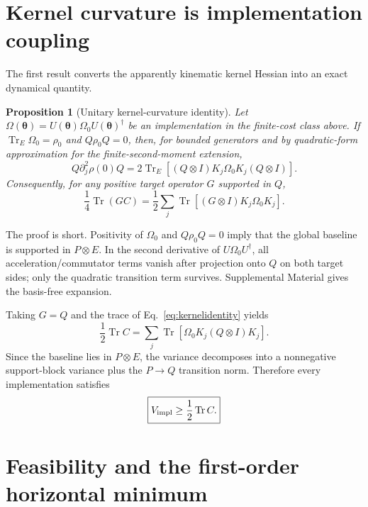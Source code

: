 \documentclass[aps,pra,preprint,nofootinbib]{revtex4-2}
\newtheorem{proposition}{Proposition}
\newcommand{\Tr}{\operatorname{Tr}}
\newcommand{\rhozero}{\rho_0}
\newcommand{\Omegazero}{\Omega_0}
\newcommand{\Vimpl}{V_{\rm impl}}
\newcommand{\Cker}{C}
\begin{document}
\section{Kernel curvature is implementation coupling}

The first result converts the apparently kinematic kernel Hessian into an exact dynamical quantity.

\begin{proposition}[Unitary kernel-curvature identity]
Let $\Omega(\bm\theta)=U(\bm\theta)\Omegazero U(\bm\theta)^\dagger$ be an implementation in the finite-cost class above. If $\Tr_E\Omegazero=\rhozero$ and $Q\rhozero Q=0$, then, for bounded generators and by quadratic-form approximation for the finite-second-moment extension,
\begin{equation}
 Q\partial_j^2\rho(0)Q
 =2\Tr_E\!\left[(Q\otimes I)K_j\Omegazero K_j(Q\otimes I)\right].
 \label{eq:kernelidentity}
\end{equation}
Consequently, for any positive target operator $G$ supported in $Q$,
\begin{equation}
 \frac14\Tr(G\Cker)
 =\frac12\sum_j\Tr\!\left[(G\otimes I)K_j\Omegazero K_j\right].
 \label{eq:weightedidentity}
\end{equation}
\end{proposition}

\noindent
The proof is short. Positivity of $\Omegazero$ and $Q\rhozero Q=0$ imply that the global baseline is supported in $P\otimes E$. In the second derivative of $U\Omegazero U^\dagger$, all acceleration/commutator terms vanish after projection onto $Q$ on both target sides; only the quadratic transition term survives. Supplemental Material gives the basis-free expansion.

Taking $G=Q$ and the trace of Eq.~\eqref{eq:kernelidentity} yields
\begin{equation}
 \frac12\Tr\Cker
 =\sum_j\Tr[\Omegazero K_j(Q\otimes I)K_j].
 \label{eq:kerneltrace}
\end{equation}
Since the baseline lies in $P\otimes E$, the variance decomposes into a nonnegative support-block variance plus the $P\to Q$ transition norm. Therefore every implementation satisfies
\begin{equation}
 \boxed{\Vimpl\ge\frac12\Tr\Cker.}
 \label{eq:universal-lower}
\end{equation}

\section{Feasibility and the first-order horizontal minimum}
\end{document}
